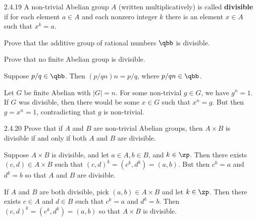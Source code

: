 \begin{spex}{2.4.19} 
    A non-trivial Abelian group $A$ (written multiplicatively) is called \textbf{divisible} if for each element $a\in A$ and each nonzero integer $k$ there is an element $x\in A$ such that $x^k=a$.  
    \begin{subexercises}
        \item Prove that the additive group of rational numbers $\qbb$ is divisible.
        \item Prove that no finite Abelian group is divisible.
    \end{subexercises}
\end{spex}

\begin{solenum}[spsol]
    \item Suppose $p/q \in \qbb$.
	Then $(p/qn)n = p/q$, where $p/qn \in \qbb$.
    \item Let $G$ be finite Abelian with $|G| = n$.
	For some non-trivial $g \in G$, we have $g^n = 1$.
	If $G$ was divisible, then there would be some $x \in G$ such that $x^n = g$.
	But then $g = x^n = 1$, contradicting that $g$ is non-trivial.
\end{solenum}

\begin{exercise}{2.4.20}
    Prove that if $A$ and $B$ are non-trivial Abelian groups, then $A\times B$ is divisible if and only if both $A$ and $B$ are divisible.
\end{exercise}

\begin{sol}
    Suppose $A \times B$ is divisible, and let $a \in A, b \in B$, and $k \in \zp$.
	Then there exists $(c, d) \in A \times B$ such that $(c, d)^k = (c^k, d^k) = (a, b)$.
	But then $c^k = a$ and $d^k = b$ so that $A$ and $B$ are divisible.
    
    If $A$ and $B$ are both divisible, pick $(a, b) \in A \times B$ and let $k \in \zp$.
	Then there exists $c \in A$ and $d \in B$ such that $c^k = a$ and $d^k = b$.
	Then $(c, d)^k = (c^k, d^k) = (a, b)$ so that $A \times B$ is divisible.
\end{sol}
